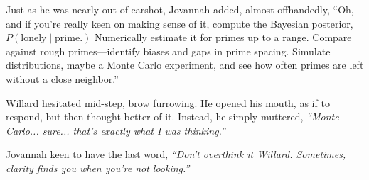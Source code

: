 Just as he was nearly out of earshot, Jovannah added, almost offhandedly, “Oh, and if you’re really keen on making sense of it, compute the Bayesian posterior, 
\(
P(\text{lonely} \mid \text{prime}.)
\)
Numerically estimate it for primes up to a range. Compare against rough primes—identify biases and gaps in prime spacing. Simulate distributions, maybe a Monte Carlo experiment, and see how often primes are left without a close neighbor.”
\bigskip

Willard hesitated mid-step, brow furrowing. He opened his mouth, as if to respond, but then thought better of it. Instead, he simply muttered, \textit{“Monte Carlo... sure... that’s exactly what I was thinking.”} 

\bigskip

Jovannah keen to have the last word, \textit{“Don’t overthink it Willard. Sometimes, clarity finds you when you’re not looking.”}
\bigskip

